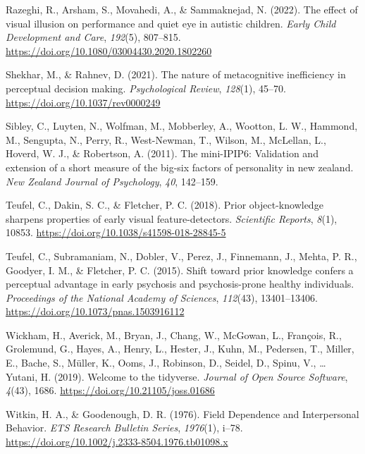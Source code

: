 \documentclass[
  man,floatsintext]{apa6}
\newlength{\cslhangindent}
\newlength{\cslentryspacingunit} %
\newenvironment{CSLReferences}[2] %
 {%
  \setlength{\parindent}{0pt}
  \ifodd #1
  \let\oldpar\par
  \def\par{\hangindent=\cslhangindent\oldpar}
  \fi
  \setlength{\parskip}{#2\cslentryspacingunit}
 }%
 {}
\begin{document}
\begin{CSLReferences}{1}{0}
\leavevmode{}%
Razeghi, R., Arsham, S., Movahedi, A., \& Sammaknejad, N. (2022). The effect of visual illusion on performance and quiet eye in autistic children. \emph{Early Child Development and Care}, \emph{192}(5), 807--815. \url{https://doi.org/10.1080/03004430.2020.1802260}

\leavevmode{}%
Shekhar, M., \& Rahnev, D. (2021). The nature of metacognitive inefficiency in perceptual decision making. \emph{Psychological Review}, \emph{128}(1), 45--70. \url{https://doi.org/10.1037/rev0000249}

\leavevmode{}%
Sibley, C., Luyten, N., Wolfman, M., Mobberley, A., Wootton, L. W., Hammond, M., Sengupta, N., Perry, R., West-Newman, T., Wilson, M., McLellan, L., Hoverd, W. J., \& Robertson, A. (2011). The mini-IPIP6: Validation and extension of a short measure of the big-six factors of personality in new zealand. \emph{New Zealand Journal of Psychology}, \emph{40}, 142--159.

\leavevmode{}%
Teufel, C., Dakin, S. C., \& Fletcher, P. C. (2018). Prior object-knowledge sharpens properties of early visual feature-detectors. \emph{Scientific Reports}, \emph{8}(1), 10853. \url{https://doi.org/10.1038/s41598-018-28845-5}

\leavevmode{}%
Teufel, C., Subramaniam, N., Dobler, V., Perez, J., Finnemann, J., Mehta, P. R., Goodyer, I. M., \& Fletcher, P. C. (2015). Shift toward prior knowledge confers a perceptual advantage in early psychosis and psychosis-prone healthy individuals. \emph{Proceedings of the National Academy of Sciences}, \emph{112}(43), 13401--13406. \url{https://doi.org/10.1073/pnas.1503916112}

\leavevmode{}%
Wickham, H., Averick, M., Bryan, J., Chang, W., McGowan, L., François, R., Grolemund, G., Hayes, A., Henry, L., Hester, J., Kuhn, M., Pedersen, T., Miller, E., Bache, S., Müller, K., Ooms, J., Robinson, D., Seidel, D., Spinu, V., \ldots{} Yutani, H. (2019). Welcome to the tidyverse. \emph{Journal of Open Source Software}, \emph{4}(43), 1686. \url{https://doi.org/10.21105/joss.01686}

\leavevmode{}%
Witkin, H. A., \& Goodenough, D. R. (1976). Field Dependence and Interpersonal Behavior. \emph{ETS Research Bulletin Series}, \emph{1976}(1), i--78. \url{https://doi.org/10.1002/j.2333-8504.1976.tb01098.x}


\end{CSLReferences}
\end{document}
